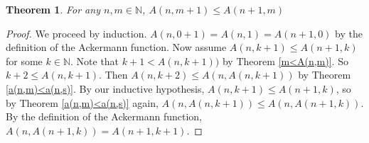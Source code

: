 \documentclass[12pt, letterpaper]{article}
\newtheorem{theorem}{Theorem}
\theoremstyle{case}
\begin{document}

    \begin{theorem}
      \label{a(n,m+1)<=a(n+1,m)}
      For any $n, m \in \mathbb{N}$, $A(n, m + 1) \leq A(n + 1, m)$
    \end{theorem}
    \begin{proof}
      We proceed by induction.
      $A(n, 0 + 1) = A(n, 1) = A(n + 1, 0)$ by the definition of the Ackermann function.
      Now assume $A(n, k + 1) \leq A(n + 1, k)$ for some $k \in \mathbb{N}$.
      Note that $k + 1 < A(n, k + 1))$ by Theorem \ref{m<A(n,m)}.
      So $k + 2 \leq A(n, k + 1)$.
      Then $A(n, k + 2) \leq A(n, A(n, k + 1))$ by Theorem \ref{a(n,m)<a(n,s)}.
      By our inductive hypothesis, $A(n, k + 1) \leq A(n + 1, k)$, so by Theorem \ref{a(n,m)<a(n,s)} again,
      $A(n, A(n, k + 1)) \leq A(n, A(n + 1, k))$.
      By the definition of the Ackermann function, $A(n, A(n + 1, k)) = A(n + 1, k + 1)$.
    \end{proof}
\end{document}
